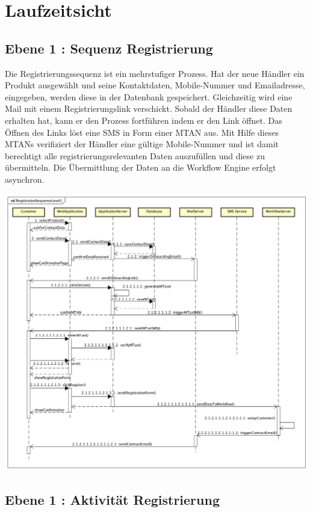 \graphicspath{{./images/}}

\chapter{Laufzeitsicht}

\section{Ebene 1 : Sequenz Registrierung}

Die Registrierungssequenz ist ein mehrstufiger Prozess. Hat der neue Händler ein Produkt ausgewählt und seine Kontaktdaten, Mobile-Nummer und Emailadresse, eingegeben, werden diese in der Datenbank gespeichert. Gleichzeitig wird eine Mail mit einem Registrierungslink verschickt. Sobald der Händler diese Daten erhalten hat, kann er den Prozess fortführen indem er den Link öffnet. Das Öffnen des Links löst eine SMS in Form einer MTAN aus. Mit Hilfe dieses MTANs verifiziert der Händler eine gültige Mobile-Nummer und ist damit berechtigt alle registrierungsrelevanten Daten auszufüllen und diese zu übermitteln. Die Übermittlung der Daten an die Workflow Engine erfolgt asynchron.
\begin{center}
	\includegraphics[scale=0.44]{RegistrationSequenceLevel1.png}
\end{center}
\newpage

\section{Ebene 1 : Aktivität Registrierung}
 
